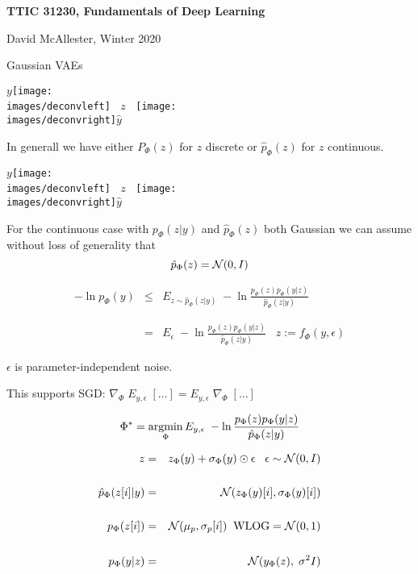 





{\Huge

  \centerline{\bf TTIC 31230, Fundamentals of Deep Learning}
  \bigskip
  \centerline{David McAllester, Winter 2020}
  \vfill
  \centerline{Gaussian VAEs}
  \vfill
  \vfill


\bigskip
\centerline{$y$\texttt{[image: \\images/deconvleft]} $\;\;z\;\;$ \texttt{[image: \\images/deconvright]}$\hat{y}$}

\bigskip
\bigskip
In generall we have either $P_\Phi(z)$ for $z$ discrete or $\hat{p}_\Phi(z)$ for $z$ continuous.


\bigskip
\centerline{$y$\texttt{[image: \\images/deconvleft]} $\;\;z\;\;$ \texttt{[image: \\images/deconvright]}$\hat{y}$}

\bigskip
\bigskip
For the continuous case with $p_\Phi(z|y)$ and $\hat{p}_\Phi(z)$ both Gaussian we can assume without loss
of generality that
\bigskip
$$\hat{p}_\Phi(z) = {\cal N}(0,I)$$


\begin{eqnarray*}
- \ln p_\Phi(y) & \leq & E_{z \sim \hat{p}_\Phi(z|y)}\;-\ln \frac{p_\Phi(z)p_\Phi(y|z)}{\hat{p}_\Phi(z|y)} \\
\\
\\
& = & E_\epsilon\;-\ln \frac{p_\Phi(z)p_\Phi(y|z)}{\hat{p}_\Phi(z|y)}\;\;\;z := f_\Phi(y,\epsilon)
\end{eqnarray*}

\vfill
$\epsilon$ is parameter-independent noise.

\vfill
This supports SGD: $\nabla_\Phi \;E_{y,\epsilon}\; [\ldots] = E_{y,\epsilon}\; \nabla_\Phi\;[\ldots]$

$$\Phi^* = \operatorname*{argmin}_\Phi E_{y,\epsilon}\;-\ln \frac{p_\Phi(z)p_\Phi(y|z)}{\hat{p}_\Phi(z|y)}$$

{\color{red}
\begin{eqnarray*}
z & = & z_\Phi(y) + \sigma_\Phi(y) \odot \epsilon\;\;\;\epsilon \sim {\cal N}(0,I) \\
\\
\hat{p}_\Phi(z[i]|y) & = & {\cal N}(z_\Phi(y)[i],\sigma_\Phi(y)[i]) \\
\\
p_\Phi(z[i]) & = & {\cal N}(\mu_p,\sigma_p[i]) \;\;\mbox{WLOG} = {\cal N}(0,1) \\
\\
p_\Phi(y|z) & = & {\cal N}(y_\Phi(z),\;\sigma^2I)
\end{eqnarray*}
}


}

